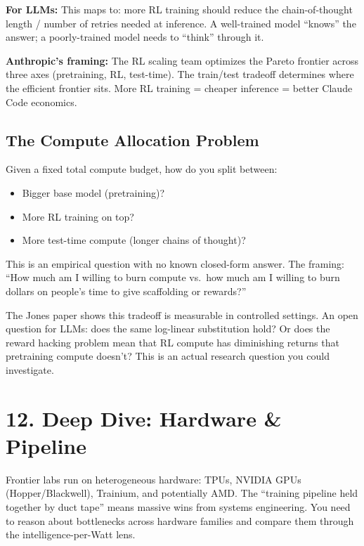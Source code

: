\textbf{For LLMs:} This maps to: more RL training should reduce the chain-of-thought length / number of retries needed at inference. A well-trained model ``knows'' the answer; a poorly-trained model needs to ``think'' through it.

\textbf{Anthropic's framing:} The RL scaling team optimizes the Pareto frontier across three axes (pretraining, RL, test-time). The train/test tradeoff determines where the efficient frontier sits. More RL training = cheaper inference = better Claude Code economics.

\subsection{The Compute Allocation Problem}

Given a fixed total compute budget, how do you split between:
\begin{itemize}
  \item Bigger base model (pretraining)?
  \item More RL training on top?
  \item More test-time compute (longer chains of thought)?
\end{itemize}

This is an empirical question with no known closed-form answer. The framing: ``How much am I willing to burn compute vs.\ how much am I willing to burn dollars on people's time to give scaffolding or rewards?''

\begin{deeper}
The Jones paper shows this tradeoff is measurable in controlled settings. An open question for LLMs: does the same log-linear substitution hold? Or does the reward hacking problem mean that RL compute has diminishing returns that pretraining compute doesn't? This is an actual research question you could investigate.
\end{deeper}

\section{12. Deep Dive: Hardware \& Pipeline}

\begin{bluf}
Frontier labs run on heterogeneous hardware: TPUs, NVIDIA GPUs (Hopper/Blackwell), Trainium, and potentially AMD. The ``training pipeline held together by duct tape'' means massive wins from systems engineering. You need to reason about bottlenecks across hardware families and compare them through the intelligence-per-Watt lens.
\end{bluf}

